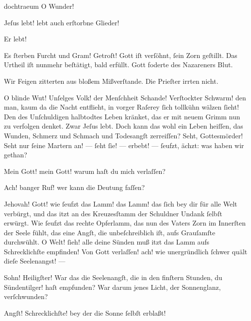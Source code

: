 \documentclass{ees}
\begin{document}
{\begin{movement}{dochtraeum}
    O Wunder!

    \hspace*{3cm} Jeſus lebt! lebt auch erſtorbne Glieder!

    Er lebt!

    \hspace*{3cm}Es ſterben Furcht und Gram!
    Getroſt! Gott iſt verſöhnt, ſein Zorn geſtillt.
    Das Urtheil iſt nunmehr beſtätigt, bald erfüllt.
    Gott foderte des Nazareners Blut.

    Wir Feigen zitterten aus bloßem Mißverſtande.
    Die Prieſter irrten nicht.

    \voice[Johannes]
    \hspace*{3cm}O blinde Wut!
    Unſelges Volk! der Menſchheit Schande!
    Verſtockter Schwarm! den man, kaum da die Nacht entflieht,
    in vorger Raſerey ſich tollkühn wälzen ſieht!
    Den des Unſchuldigen halbtodtes Leben kränket,
    das er mit neuem Grimm nun zu verfolgen denket.
    Zwar Jeſus lebt. Doch kann das wohl ein Leben heiſſen,
    das Wunden, Schmerz und Schmach und Todesangſt zerreiſſen?
    Seht, Gottesmörder! Seht nur ſeine Martern an! —
    ſeht ſie! — erbebt! — ſeufzt, ächzt: was haben wir gethan?

    \voice[Jeſus]
    Mein Gott! mein Gott! warum haſt du mich verlaſſen?

    Ach! banger Ruf! wer kann die Deutung faſſen?

    \voice[Johannes]
    Jehovah! Gott! wie ſeufzt das Lamm!
    das Lamm! das ſich bey dir für alle Welt verbürgt,
    und das itzt an des Kreuzesſtamm
    der Schuldner Undank ſelbſt erwürgt.
    Wie ſeufzt das rechte Opferlamm,
    das nun des Vaters Zorn im Innerſten der Seele fühlt,
    das eine Angſt, die unbeſchreiblich iſt,
    aufs Grauſamſte durchwühlt.
    O Welt! ſieh! alle deine Sünden
    muß itzt das Lamm aufs Schrecklichſte empfinden!
    Von Gott verlaſſen! ach! wie unergründlich ſchwer
    quält dieſe Seelenangst! —

    \voice[Maria]
    \hspace*{3cm} Sohn! Heiligſter!
    War das die Seelenangſt, die in den finſtern Stunden,
    du Sündentilger! haſt empfunden?
    War darum jenes Licht, der Sonnenglanz, verſchwunden?

    Angſt! Schrecklichſte! bey der die Sonne ſelbſt erblaßt!


\end{movement}}
\end{document}
